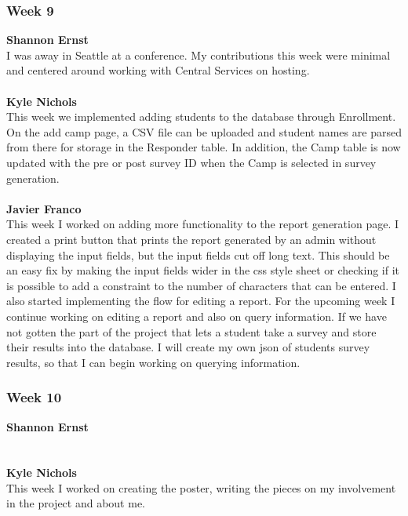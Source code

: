 \documentclass[../final.tex]{subfiles}
\begin{document}
\subsubsection{Week 9}
\textbf{Shannon Ernst}\\
I was away in Seattle at a conference. My contributions this week were minimal and centered around working with Central Services on hosting. \\ \\
\textbf{Kyle Nichols}\\
This week we implemented adding students to the database through Enrollment. On the add camp page, a CSV file can be uploaded and student names are parsed from there for storage in the Responder table. In addition, the Camp table is now updated with the pre or post survey ID when the Camp is selected in survey generation. \\ \\
\textbf{Javier Franco}\\
This week I worked on adding more functionality to the report generation page. I created a print button that prints the report generated by an admin without displaying the input fields, but the input fields cut off long text. This should be an easy fix by making the input fields wider in the css style sheet or checking if it is possible to add a constraint to the number of characters that can be entered. I also started implementing the flow for editing a report. For the upcoming week I continue working on editing a report and also on query information. If we have not gotten the part of the project that lets a student take a survey and store their results into the database. I will create my own json of students survey results, so that I can begin working on querying information. \\
\subsubsection{Week 10}
\textbf{Shannon Ernst}\\ \\ \\
\textbf{Kyle Nichols}\\
This week I worked on creating the poster, writing the pieces on my involvement in the project and about me.
\end{document}
